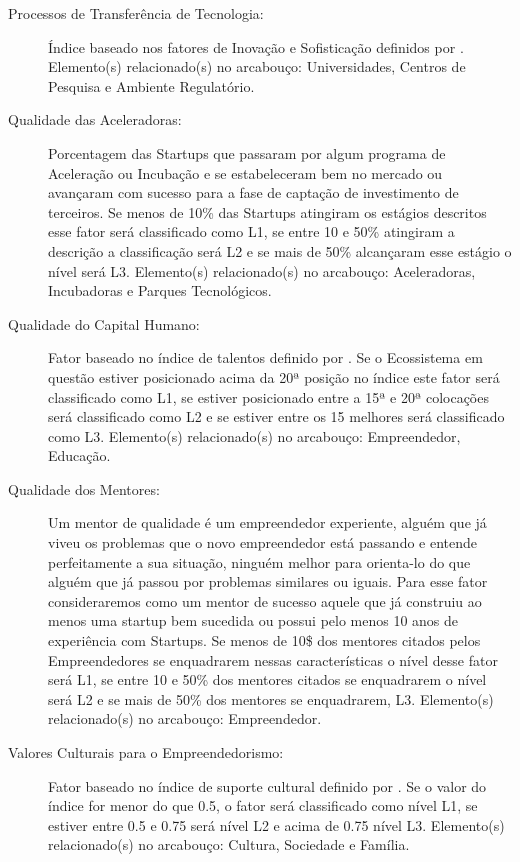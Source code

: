 \begin{description}
  \item [Processos de Transferência de Tecnologia:] Índice baseado nos fatores de Inovação e Sofisticação definidos por . Elemento(s) relacionado(s) no arcabouço: Universidades, Centros de Pesquisa e Ambiente Regulatório.
  
  \item [Qualidade das Aceleradoras:] Porcentagem das Startups que passaram por algum programa de Aceleração ou Incubação e se estabeleceram bem no mercado ou avançaram com sucesso para a fase de captação de investimento de terceiros. Se menos de 10\% das Startups atingiram os estágios descritos esse fator será classificado como L1, se entre 10 e 50\% atingiram a descrição a classificação será L2 e se mais de 50\% alcançaram esse estágio o nível será L3. Elemento(s) relacionado(s) no arcabouço: Aceleradoras, Incubadoras e Parques Tecnológicos.
  
  \item [Qualidade do Capital Humano:] Fator baseado no índice de talentos definido por . Se o Ecossistema em questão estiver posicionado acima da 20ª posição no índice este fator será classificado como L1, se estiver posicionado entre a 15ª e 20ª colocações será classificado como L2 e se estiver entre os 15 melhores será classificado como L3. Elemento(s) relacionado(s) no arcabouço: Empreendedor, Educação.
  
  \item [Qualidade dos Mentores:] Um mentor de qualidade é um empreendedor experiente, alguém que já viveu os problemas que o novo empreendedor está passando e entende perfeitamente a sua situação, ninguém melhor para orienta-lo do que alguém que já passou por problemas similares ou iguais. Para esse fator consideraremos como um mentor de sucesso aquele que já construiu ao menos uma startup bem sucedida ou possui pelo menos 10 anos de experiência com Startups. Se menos de 10\$ dos mentores citados pelos Empreendedores se enquadrarem nessas características o nível desse fator será L1, se entre 10 e 50\% dos mentores citados se enquadrarem o nível será L2 e se mais de 50\% dos mentores se enquadrarem, L3. Elemento(s) relacionado(s) no arcabouço: Empreendedor.
  
  \item [Valores Culturais para o Empreendedorismo:] Fator baseado no índice de suporte cultural definido por . Se o valor do índice for menor do que 0.5, o fator será classificado como nível L1, se estiver entre 0.5 e 0.75 será nível L2 e acima de 0.75 nível L3. Elemento(s) relacionado(s) no arcabouço: Cultura, Sociedade e Família.
\end{description}

